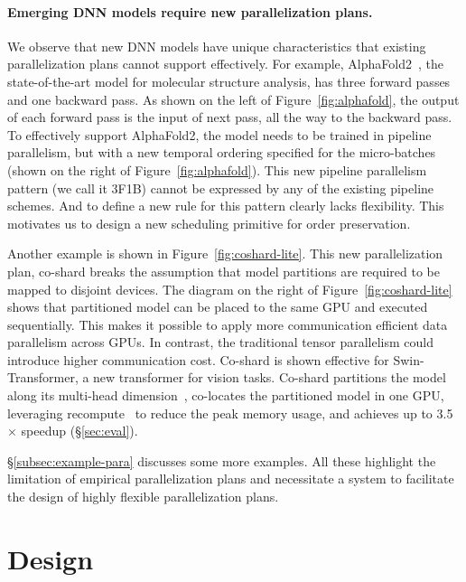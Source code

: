 \paragraph{Emerging DNN models require new parallelization plans.}

We observe that new DNN models have unique characteristics that existing parallelization plans cannot support effectively. For example, AlphaFold2~\cite{alphafold}, the state-of-the-art model for molecular structure analysis, has three forward passes and one backward pass. As shown on the left of Figure~\ref{fig:alphafold}, the output of each forward pass is the input of next pass, all the way to the backward pass. To effectively support AlphaFold2, the model needs to be trained in pipeline parallelism, but with a new temporal ordering specified for the micro-batches (shown on the right of Figure~\ref{fig:alphafold}). This new pipeline parallelism pattern (we call it 3F1B) cannot be expressed by any of the existing pipeline schemes. And to define a new rule for this pattern clearly lacks flexibility. This motivates us to design a new scheduling primitive for order preservation. 

Another example is shown in Figure~\ref{fig:coshard-lite}. This new parallelization plan, {co-shard} breaks the assumption that model partitions are required to be mapped to disjoint devices. The diagram on the right of Figure~\ref{fig:coshard-lite} shows that partitioned model can be placed to the same GPU and executed sequentially. This makes it possible to apply more communication efficient data parallelism across GPUs. In contrast, the traditional tensor parallelism could introduce higher communication cost. Co-shard is shown effective for Swin-Transformer\cite{swin-v2}, a new transformer for vision tasks. Co-shard partitions the model along its multi-head dimension~\cite{attention}, co-locates the partitioned model in one GPU, leveraging recompute~\cite{recompute} to reduce the peak memory usage, and achieves up to 3.5$\times$ speedup (\S\ref{sec:eval}).

\S\ref{subsec:example-para} discusses some more examples. All these highlight the limitation of empirical parallelization plans and necessitate a system to facilitate the design of highly flexible parallelization plans.

\section{Design}
\label{design}


